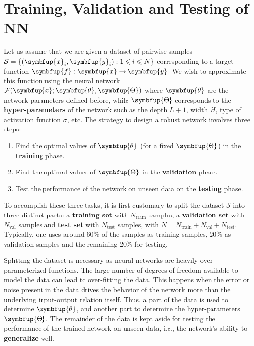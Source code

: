 \documentclass[11pt]{extarticle}
\newcommand{\ds}{\displaystyle}
\newcommand{\vf}{\symbfup{f}}
\newcommand{\vx}{\symbfup{x}}
\newcommand{\vy}{\symbfup{y}}
\theoremstyle{definition}
\newcommand{\btheta}{\symbfup{\theta}}
\newcommand{\Hp}{\symbfup{\Theta}}
\begin{document}
\section*{Training, Validation and Testing of NN}

Let us assume that we are given a dataset of pairwise samples $\mathcal{S} = \{(\vx_i,\vy_i): 1 \leqslant i \leqslant N\}$ corresponding to a target function $\vf: \vx\to\vy$. We wish to approximate this function using the neural network $\ds\mathcal{F}(\vx; \btheta, \Hp)$
where $\btheta$ are the network parameters defined before, while $\Hp$ corresponds to the \textbf{hyper-parameters} of the network such as the depth $L+1$, width $H$, type of activation function $\sigma$, etc. The strategy to design a robust network involves three steps:
\begin{enumerate}
\item Find the optimal values of $\btheta$ (for a fixed $\Hp$)  in the \textbf{training} phase.
\item Find the optimal values of $\Hp$ in the \textbf{validation} phase.
\item Test the performance of the network on unseen data on the \textbf{testing} phase.
\end{enumerate}

To accomplish these three tasks, it is first customary to split the dataset $\mathcal{S}$ into three distinct parts: a \textbf{training set} with $N_{\text{train}}$ samples, a \textbf{validation set} with $N_{\text{val}}$ samples and \textbf{test set} with $N_{\text{test}}$ samples, with $N = N_{\text{train}} + N_{\text{val}} + N_{\text{test}}$. Typically, one uses around 60\% of the samples as training samples, 20\% as validation samples and the remaining 20\% for testing. 

Splitting the dataset is necessary as neural networks are heavily over-parameterized functions. The large number of degrees of freedom available to model the data can lead to over-fitting the data. This happens when the error or noise present in the data drives the behavior of the network more than the underlying input-output relation itself. Thus, a part of the data is used to determine $\btheta$, and another part to determine the hyper-parameters $\Hp$. The remainder of the data is kept aside for testing the performance 
 of the trained network on unseen data, i.e., the network's ability to \textbf{generalize} well.
\end{document}
